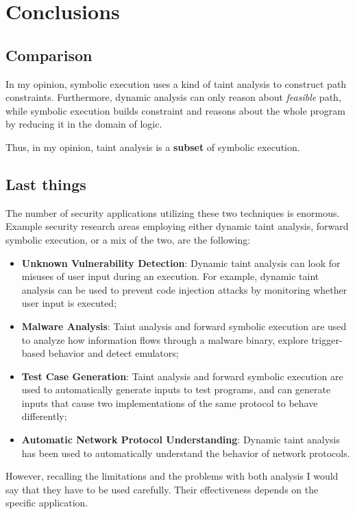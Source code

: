 \section{Conclusions}
\subsection{Comparison}
In my opinion, symbolic execution uses a kind of taint analysis to construct path constraints. Furthermore, dynamic analysis can only reason about \textit{feasible} path, while symbolic execution builds constraint and reasons about the whole program by reducing it in the domain of logic.

Thus, in my opinion, taint analysis is a \textbf{subset} of symbolic execution.

\subsection{Last things}
The number of security applications utilizing these two techniques is enormous. Example security research areas employing either dynamic taint analysis, forward symbolic execution, or a mix of the two, are the following:
\begin{itemize}
	\item \textbf{Unknown Vulnerability Detection}: Dynamic taint analysis can look for misuses of user input during an execution. For example, dynamic taint analysis can be used to prevent code injection attacks by monitoring whether user input is executed;
	\item \textbf{Malware Analysis}: Taint analysis and forward symbolic execution are used to analyze how information flows through a malware binary, explore trigger-based behavior and detect emulators;
	\item \textbf{Test Case Generation}: Taint analysis and forward symbolic execution are used to automatically generate inputs to test programs, and can generate inputs that cause two implementations of the same protocol to behave differently;
	\item \textbf{Automatic Network Protocol Understanding}: Dynamic taint analysis has been used to automatically understand the behavior of network protocols.
\end{itemize}

However, recalling the limitations and the problems with both analysis I would say that they have to be used carefully. Their effectiveness depends on the specific application.

